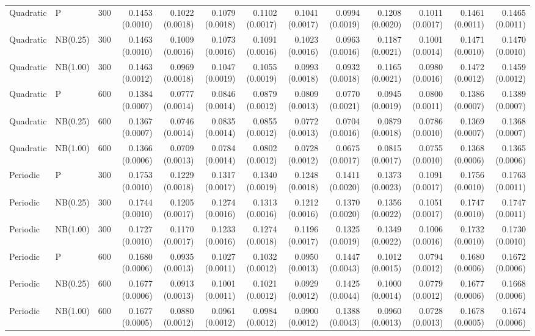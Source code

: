 \begin{table}[p]
{\begin{tabular}{lllrrrrrrrrrr}
\hline
Quadratic & P & 300 & 0.1453 (0.0010) & 0.1022 (0.0018) & 0.1079 (0.0018) & 0.1102 (0.0017) & 0.1041 (0.0017) & 0.0994 (0.0019) & 0.1208 (0.0020) & 0.1011 (0.0017) & 0.1461 (0.0011) & 0.1465 (0.0011) \\
Quadratic & NB(0.25) & 300 & 0.1463 (0.0010) & 0.1009 (0.0016) & 0.1073 (0.0016) & 0.1091 (0.0016) & 0.1023 (0.0016) & 0.0963 (0.0016) & 0.1187 (0.0021) & 0.1001 (0.0014) & 0.1471 (0.0010) & 0.1470 (0.0010) \\
Quadratic & NB(1.00) & 300 & 0.1463 (0.0012) & 0.0969 (0.0018) & 0.1047 (0.0019) & 0.1055 (0.0019) & 0.0993 (0.0018) & 0.0932 (0.0018) & 0.1165 (0.0021) & 0.0980 (0.0016) & 0.1472 (0.0012) & 0.1459 (0.0012) \\
Quadratic & P & 600 & 0.1384 (0.0007) & 0.0777 (0.0014) & 0.0846 (0.0014) & 0.0879 (0.0012) & 0.0809 (0.0013) & 0.0770 (0.0021) & 0.0945 (0.0019) & 0.0800 (0.0011) & 0.1386 (0.0007) & 0.1389 (0.0007) \\
Quadratic & NB(0.25) & 600 & 0.1367 (0.0007) & 0.0746 (0.0014) & 0.0835 (0.0014) & 0.0855 (0.0012) & 0.0772 (0.0013) & 0.0704 (0.0016) & 0.0879 (0.0018) & 0.0786 (0.0010) & 0.1369 (0.0007) & 0.1368 (0.0007) \\
Quadratic & NB(1.00) & 600 & 0.1366 (0.0006) & 0.0709 (0.0013) & 0.0784 (0.0014) & 0.0802 (0.0012) & 0.0728 (0.0012) & 0.0675 (0.0017) & 0.0815 (0.0017) & 0.0755 (0.0010) & 0.1368 (0.0006) & 0.1365 (0.0006) \\
\hline
Periodic & P & 300 & 0.1753 (0.0010) & 0.1229 (0.0018) & 0.1317 (0.0017) & 0.1340 (0.0019) & 0.1248 (0.0018) & 0.1411 (0.0020) & 0.1373 (0.0023) & 0.1091 (0.0017) & 0.1756 (0.0010) & 0.1763 (0.0011) \\
Periodic & NB(0.25) & 300 & 0.1744 (0.0010) & 0.1205 (0.0017) & 0.1274 (0.0016) & 0.1313 (0.0016) & 0.1212 (0.0016) & 0.1370 (0.0020) & 0.1356 (0.0022) & 0.1051 (0.0017) & 0.1747 (0.0010) & 0.1747 (0.0011) \\
Periodic & NB(1.00) & 300 & 0.1727 (0.0010) & 0.1170 (0.0017) & 0.1233 (0.0016) & 0.1274 (0.0018) & 0.1196 (0.0017) & 0.1325 (0.0019) & 0.1349 (0.0022) & 0.1006 (0.0016) & 0.1732 (0.0010) & 0.1730 (0.0010) \\
Periodic & P & 600 & 0.1680 (0.0006) & 0.0935 (0.0013) & 0.1027 (0.0011) & 0.1032 (0.0012) & 0.0950 (0.0013) & 0.1447 (0.0043) & 0.1012 (0.0015) & 0.0794 (0.0012) & 0.1680 (0.0006) & 0.1672 (0.0006) \\
Periodic & NB(0.25) & 600 & 0.1677 (0.0006) & 0.0913 (0.0013) & 0.1001 (0.0011) & 0.1021 (0.0012) & 0.0929 (0.0012) & 0.1425 (0.0044) & 0.1000 (0.0014) & 0.0779 (0.0012) & 0.1677 (0.0006) & 0.1668 (0.0006) \\
Periodic & NB(1.00) & 600 & 0.1677 (0.0005) & 0.0880 (0.0012) & 0.0961 (0.0012) & 0.0984 (0.0012) & 0.0900 (0.0012) & 0.1388 (0.0043) & 0.0960 (0.0013) & 0.0728 (0.0013) & 0.1678 (0.0005) & 0.1674 (0.0006) \\
\hline
\end{tabular}%
}
\end{table}


